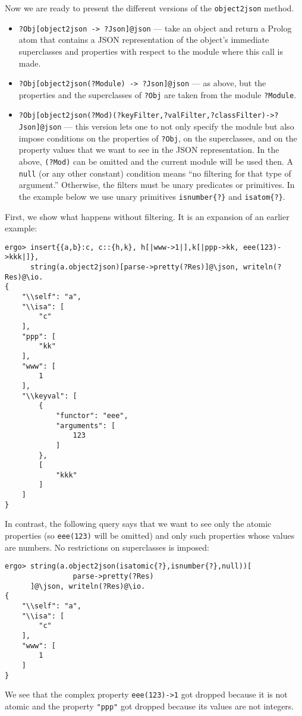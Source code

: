 Now we are ready to present the different versions of the
\texttt{object2json} method.
\begin{itemize}
\item  \texttt{?Obj[object2json -> ?Json]@\bs{}json} --- take an object and
  return a
  Prolog atom that contains a JSON representation of the object's
  immediate superclasses and properties with respect to the \ERGO module
  where this call is made.
\item \texttt{?Obj[object2json(?Module) -> ?Json]@\bs{}json} --- as above, but
  the properties and the superclasses of \texttt{?Obj} are taken from the
  module \texttt{?Module}.
\item
  \texttt{?Obj[object2json(?Mod)(?keyFilter,?valFilter,?classFilter)->?Json]@\bs{}json}
  --- this version lets one to not only specify the module but also impose
  conditions on the properties of \texttt{?Obj}, on the superclasses, and
  on the property values that we want to see in the JSON representation.
  In the above, \texttt{(?Mod)} can be omitted and the current module will
  be used then. A \texttt{null} (or any
  other constant) condition means ``no filtering for that type of
  argument.''  Otherwise, the filters must be unary predicates or
  primitives. In the example below we use unary primitives
  \texttt{isnumber\{?\}} and \texttt{isatom\{?\}}.
\end{itemize}
First, we show what happens without filtering. It is an expansion of an
earlier example:
\begin{verbatim}
ergo> insert{{a,b}:c, c::{h,k}, h[|www->1|],k[|ppp->kk, eee(123)->kkk|]},
      string(a.object2json)[parse->pretty(?Res)]@\json, writeln(?Res)@\io.
{
    "\\self": "a",
    "\\isa": [
        "c"
    ],
    "ppp": [
        "kk"
    ],
    "www": [
        1
    ],
    "\\keyval": [
        {
            "functor": "eee",
            "arguments": [
                123
            ]
        },
        [
            "kkk"
        ]
    ]
}
\end{verbatim}
In contrast, the following query says that we want to see only the atomic
properties (so \texttt{eee(123)} will be omitted) and only such properties
whose values are numbers. No restrictions on superclasses is imposed:
\begin{verbatim}
ergo> string(a.object2json(isatomic{?},isnumber{?},null))[
                parse->pretty(?Res)
      ]@\json, writeln(?Res)@\io.
{
    "\\self": "a",
    "\\isa": [
        "c"
    ],
    "www": [
        1
    ]
}
\end{verbatim}
We see that the complex property \texttt{eee(123)->1} got dropped because
it is not atomic and the property \texttt{"ppp"} got dropped because its
values are not integers.

